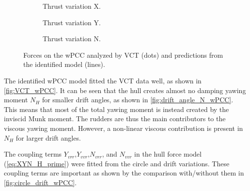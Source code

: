 \begin{figure}[H]
     \vfill
     \begin{subfigure}[b]{0.3\textwidth}
         \centering
         
        \caption{Thrust variation X.}
        \label{fig:Thrust variation_X_wPCC}
     \end{subfigure}
     \hfill
     \begin{subfigure}[b]{0.3\textwidth}
         \centering
         
        \caption{Thrust variation Y.}
        \label{fig:Thrust variation_Y_wPCC}
     \end{subfigure}
     \hfill
     \begin{subfigure}[b]{0.3\textwidth}
         \centering
         
        \caption{Thrust variation N.}
        \label{fig:Thrust variation_N_wPCC}
     \end{subfigure}
     
    \caption{Forces on the wPCC analyzed by VCT (dots) and predictions from the identified model (lines).}
    \label{fig:VCT_wPCC}
\end{figure}

\noindent The identified wPCC model fitted the VCT data well, as shown in \autoref{fig:VCT_wPCC}. 
It can be seen that the hull creates almost no damping yawing moment $N_H$ for smaller drift angles, as shown in \autoref{fig:drift_angle_N_wPCC}. This means that most of the total yawing moment is instead created by the inviscid Munk moment. The rudders are thus the main contributors to the viscous yawing moment. However, a non-linear viscous contribution is present in $N_H$ for larger drift angles. 

The coupling terms $Y_{vrr}$,$Y_{vvr}$,$N_{vrr}$, and $N_{vvr}$ in the hull force model (\autoref{eq:XYN_H_prime}) were fitted from the circle and drift variations. These coupling terms are important as shown by the comparison with/without them in \autoref{fig:circle_drift_wPCC}.


